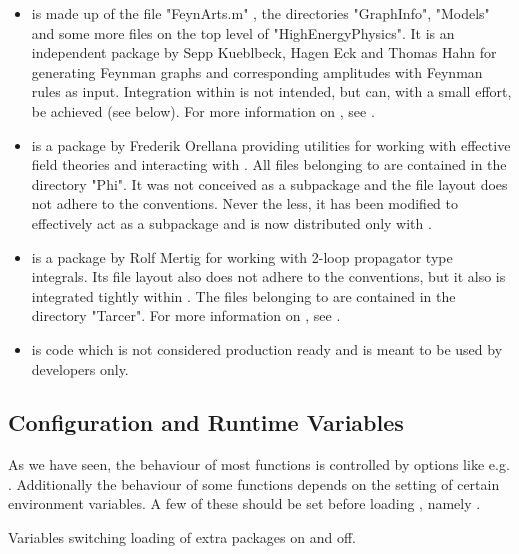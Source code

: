 \begin{itemize}

\item{{\bf \fa} is made up of the file "FeynArts.m" , the directories "GraphInfo", "Models" and some more files on the top level of "HighEnergyPhysics". It is an independent package by Sepp Kueblbeck, Hagen Eck and Thomas Hahn for generating Feynman graphs and corresponding amplitudes with Feynman rules as input. Integration within \fc is not intended, but can, with a small effort, be achieved (see \fphi below).
For more information on \fa, see \cite{feynarts}.}

\item{{\bf \fphi} is a package by Frederik Orellana providing utilities for working with effective field theories and interacting with \fa. All files belonging to \fphi are contained in the directory "Phi". It was not conceived as a \fc subpackage and the file layout does not adhere to the \fc conventions. Never the less, it has been modified to effectively act as a \fc subpackage and is now distributed only with \fc.}

\item{{\bf \tarcer} is a package by Rolf Mertig for working with 2-loop
propagator type integrals. Its file layout also does not adhere to the \fc conventions, but it also is integrated tightly within \fc. The files belonging to \tarcer are contained in the directory "Tarcer". For more information on \tarcer, see \cite{Mertig:1998vk}.}

\item{{\bf \fcdevel} is code which is not considered production ready and is meant to be used by developers only.}

\end{itemize}

\subsection{Configuration and Runtime Variables}
\label{gamma5}

As we have seen, the behaviour of most functions is controlled by options like e.g. . Additionally the behaviour of some functions depends on the setting of certain environment variables. A few of these should be set before loading \fc, namely .

 {Variables switching loading of extra packages on and off.}

